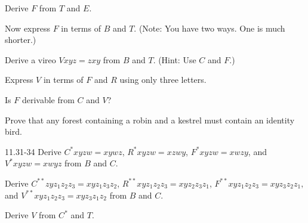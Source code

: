 \documentclass[12pt, letterpaper]{article}
\begin{document}
\begin{prob}{11.25}
Derive $F$ from $T$ and $E$.
\end{prob}

\begin{prob}{11.26}
Now express $F$ in terms of $B$ and $T$. (Note: You have two ways. One is much shorter.)
\end{prob}

\begin{prob}{11.27}
Derive a vireo $Vxyz = zxy$ from $B$ and $T$. (Hint: Use $C$ and $F$.)
\end{prob}

\begin{prob}{11.28}
Express $V$ in terms of $F$ and $R$ using only three letters.
\end{prob}

\begin{prob}{11.29}
Is $F$ derivable from $C$ and $V$?
\end{prob}

\begin{prob}{11.30}
Prove that any forest containing a robin and a kestrel must contain an identity bird.
\end{prob}

\begin{prob}{11.31-34}
Derive $C^*xyzw = xywz$, $R^*xyzw = xzwy$, $F^*xyzw = xwzy$, and $V^*xyzw = xwyz$ from $B$ and $C$.
\end{prob}

\begin{prob}{11.35}
Derive $C^{**}zyz_1z_2z_3 = xyz_1z_3z_2$, $R^{**}xyz_1z_2z_3 = xyz_2z_3z_1$, $F^{**}xyz_1z_2z_3 = xyz_3z_2z_1,$ and $V^{**}xyz_1z_2z_3 = xyz_3z_1z_2$ from $B$ and $C$.
\end{prob}

\begin{prob}{11.36}
Derive $V$ from $C^*$ and $T$.
\end{prob}
\end{document}
